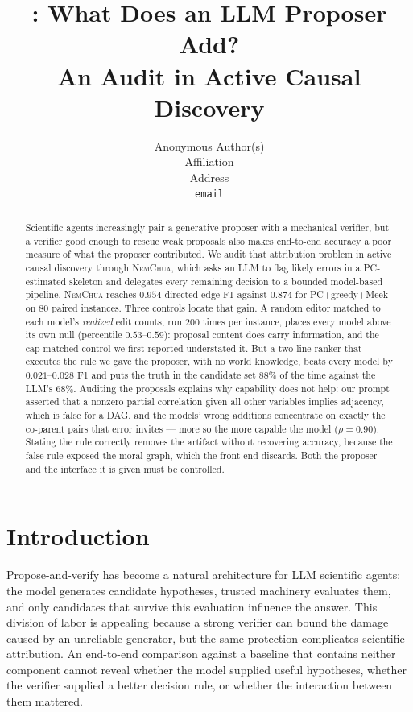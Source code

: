 \documentclass{article}
\title{\nem: What Does an LLM Proposer Add?\\ An Audit in Active Causal Discovery}
\author{%
  Anonymous Author(s) \\
  Affiliation \\
  Address \\
  \texttt{email} \\
}
\newcommand{\nem}{\textsc{NemChua}}
\begin{document}
\maketitle

\begin{abstract}
Scientific agents increasingly pair a generative proposer with a mechanical verifier, but a verifier
good enough to rescue weak proposals also makes end-to-end accuracy a poor measure of what the
proposer contributed. We audit that attribution problem in active causal discovery through \nem{},
which asks an LLM to flag likely errors in a PC-estimated skeleton and delegates every remaining
decision to a bounded model-based pipeline. \nem{} reaches $0.954$ directed-edge F1 against $0.874$
for PC+greedy+Meek on $80$ paired instances. Three controls locate that gain. A random editor
matched to each model's \emph{realized} edit counts, run $200$ times per instance, places every
model above its own null (percentile $0.53$--$0.59$): proposal content does carry information, and
the cap-matched control we first reported understated it. But a two-line ranker that executes the
rule we gave the proposer, with no world knowledge, beats every model by $0.021$--$0.028$ F1 and
puts the truth in the candidate set $88\%$ of the time against the LLM's $68\%$. Auditing the
proposals explains why capability does not help: our prompt asserted that a nonzero partial
correlation given all other variables implies adjacency, which is false for a DAG, and the models'
wrong additions concentrate on exactly the co-parent pairs that error invites --- more so the more
capable the model ($\rho=0.90$). Stating the rule correctly removes the artifact without recovering
accuracy, because the false rule exposed the moral graph, which the front-end discards. Both the
proposer and the interface it is given must be controlled.
\end{abstract}

\section{Introduction}
\label{sec:intro}

Propose-and-verify has become a natural architecture for LLM scientific agents: the model generates
candidate hypotheses, trusted machinery evaluates them, and only candidates that survive this
evaluation influence the answer. This division of labor is appealing because a strong verifier can
bound the damage caused by an unreliable generator, but the same protection complicates scientific
attribution. An end-to-end comparison against a baseline that contains neither component
cannot reveal whether the model supplied useful hypotheses, whether the verifier supplied a better
decision rule, or whether the interaction between them mattered.
\end{document}
